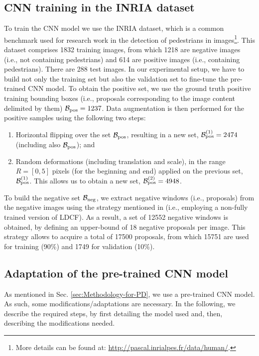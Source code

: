 \documentclass[5p,time]{elsarticle}
\begin{document}
\subsection{CNN training in the INRIA dataset}\label{sec:deep-trn-tst}

To train the CNN model we use the INRIA dataset, which is a common benchmark used for research work in the detection of pedestrians in images\footnote{More details can be found at: \url{http://pascal.inrialpes.fr/data/human/}.}. This dataset comprises 1832 training images, from which 1218 are negative images (i.e., not containing pedestrians) and 614 are positive images (i.e., containing pedestrians). There are 288 test images. In our experimental setup, we have to build not only the training set but also the validation set to fine-tune the pre-trained CNN model. To obtain the positive set, we use the ground truth positive training bounding boxes (i.e., proposals corresponding to the image content delimited by them) ${\cal B}_{\rm pos}=1237$. Data augmentation is then performed for the positive samples using the following two steps:
\begin{enumerate}
	\item{Horizontal flipping over the set ${\cal B}_{\rm pos}$, resulting in a new set, ${\cal B}^{(1)}_{\rm pos}=2474$ (including also
		${\cal B}_{\rm pos}$); and} 
	\item{Random deformations (including translation and scale), in the range $R=[0, 5]$ pixels (for the beginning and end) applied on the previous set, ${\cal B}^{(1)}_{\rm pos}$. This allows us to obtain a new set, ${\cal B}^{(2)}_{\rm pos}=4948$.} 
\end{enumerate}

To build the negative set ${\cal B}_{\rm neg}$, we extract negative
windows (i.e., proposals) from the negative images using the
strategy mentioned in \cite{RibeiroPR2016} (i.e., employing a
non-fully trained version of LDCF). As a result, a set of 12552
negative windows is obtained, by defining an upper-bound of 18
negative proposals per image. This strategy allows to acquire a
total of 17500 proposals, from which 15751 are used for training
(90$\%$) and 1749 for validation (10$\%$).

\subsection{Adaptation of the pre-trained CNN model}\label{sec:Adaptation of the CNN}
As mentioned in Sec. \ref{sec:Methodology-for-PD}, we use a pre-trained CNN model. As such, some modifications/adaptations are necessary. In the following, we describe the required steps, by first detailing the model used and, then, describing the modifications needed.
\end{document}
